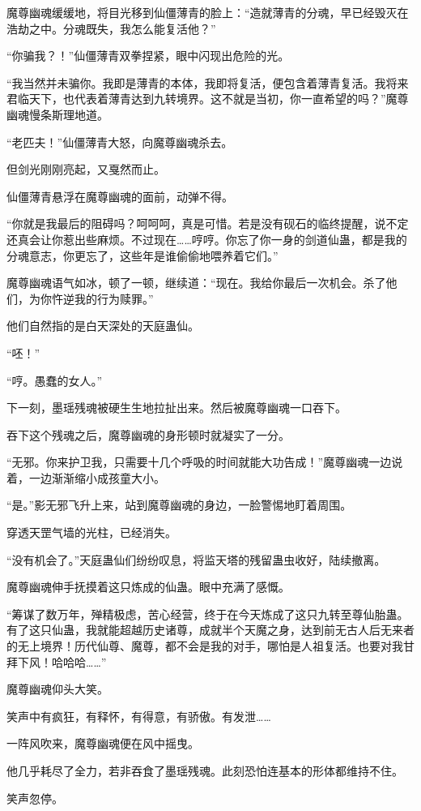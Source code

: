 \begin{this_body}
魔尊幽魂缓缓地，将目光移到仙僵薄青的脸上：“造就薄青的分魂，早已经毁灭在浩劫之中。分魂既失，我怎么能复活他？”

“你骗我？！”仙僵薄青双拳捏紧，眼中闪现出危险的光。

“我当然并未骗你。我即是薄青的本体，我即将复活，便包含着薄青复活。我将来君临天下，也代表着薄青达到九转境界。这不就是当初，你一直希望的吗？”魔尊幽魂慢条斯理地道。

“老匹夫！”仙僵薄青大怒，向魔尊幽魂杀去。

但剑光刚刚亮起，又戛然而止。

仙僵薄青悬浮在魔尊幽魂的面前，动弹不得。

“你就是我最后的阻碍吗？呵呵呵，真是可惜。若是没有砚石的临终提醒，说不定还真会让你惹出些麻烦。不过现在……哼哼。你忘了你一身的剑道仙蛊，都是我的分魂意志，你更忘了，这些年是谁偷偷地喂养着它们。”

魔尊幽魂语气如冰，顿了一顿，继续道：“现在。我给你最后一次机会。杀了他们，为你忤逆我的行为赎罪。”

他们自然指的是白天深处的天庭蛊仙。

“呸！”

“哼。愚蠢的女人。”

下一刻，墨瑶残魂被硬生生地拉扯出来。然后被魔尊幽魂一口吞下。

吞下这个残魂之后，魔尊幽魂的身形顿时就凝实了一分。

“无邪。你来护卫我，只需要十几个呼吸的时间就能大功告成！”魔尊幽魂一边说着，一边渐渐缩小成孩童大小。

“是。”影无邪飞升上来，站到魔尊幽魂的身边，一脸警惕地盯着周围。

穿透天罡气墙的光柱，已经消失。

“没有机会了。”天庭蛊仙们纷纷叹息，将监天塔的残留蛊虫收好，陆续撤离。

魔尊幽魂伸手抚摸着这只炼成的仙蛊。眼中充满了感慨。

“筹谋了数万年，殚精极虑，苦心经营，终于在今天炼成了这只九转至尊仙胎蛊。有了这只仙蛊，我就能超越历史诸尊，成就半个天魔之身，达到前无古人后无来者的无上境界！历代仙尊、魔尊，都不会是我的对手，哪怕是人祖复活。也要对我甘拜下风！哈哈哈……”

魔尊幽魂仰头大笑。

笑声中有疯狂，有释怀，有得意，有骄傲。有发泄……

一阵风吹来，魔尊幽魂便在风中摇曳。

他几乎耗尽了全力，若非吞食了墨瑶残魂。此刻恐怕连基本的形体都维持不住。

笑声忽停。


\end{this_body}
